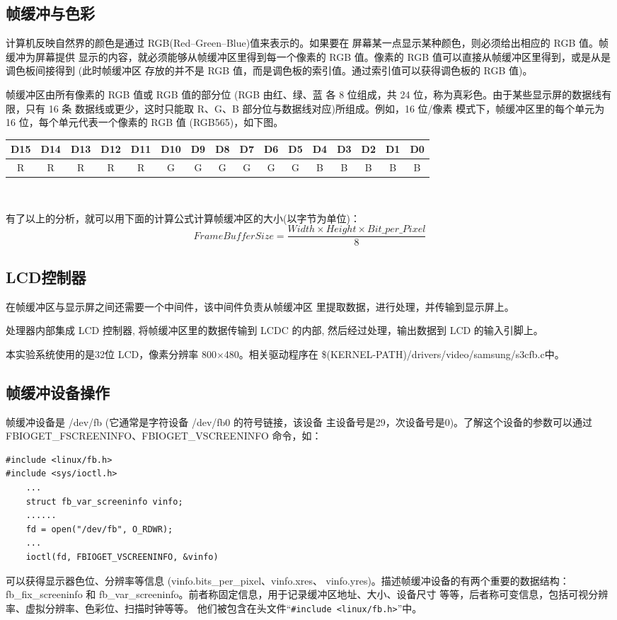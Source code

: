 \subsection{帧缓冲与色彩}
计算机反映自然界的颜色是通过 RGB(Red--Green--Blue)值来表示的。如果要在
屏幕某一点显示某种颜色，则必须给出相应的 RGB 值。帧缓冲为屏幕提供
显示的内容，就必须能够从帧缓冲区里得到每一个像素的 RGB 值。像素的
RGB 值可以直接从帧缓冲区里得到，或是从是调色板间接得到 (此时帧缓冲区
存放的并不是 RGB 值，而是调色板的索引值。通过索引值可以获得调色板的
RGB 值)。

帧缓冲区由所有像素的 RGB 值或 RGB 值的部分位 (RGB 由红、绿、蓝
各 8 位组成，共 24 位，称为真彩色。由于某些显示屏的数据线有限，只有 16 条
数据线或更少，这时只能取 R、G、B 部分位与数据线对应)所组成。例如，16 位/像素
模式下，帧缓冲区里的每个单元为 16 位，每个单元代表一个像素的 RGB 值
(RGB565)，如下图。\\

\small
\begin{tabular}{|*{16}{c|}}
\hline
   D15 & D14 & D13 & D12 & D11 & D10 & D9 & D8 &
        D7 & D6 & D5 & D4 & D3 & D2 & D1 & D0\\\hline
  R & R & R & R & R & G & G & G & G & G & G & B & B & B & B & B\\\hline
\end{tabular}
\ \\
\normalsize

有了以上的分析，就可以用下面的计算公式计算帧缓冲区的大小(以字节为单位)：
$$
	FrameBufferSize=\frac{Width \times Height \times Bit\_per\_Pixel}{8}
$$

\subsection{LCD控制器}
在帧缓冲区与显示屏之间还需要一个中间件，该中间件负责从帧缓冲区
里提取数据，进行处理，并传输到显示屏上。

处理器内部集成 LCD 控制器, 将帧缓冲区里的数据传输到 LCDC 的内部,
然后经过处理，输出数据到 LCD 的输入引脚上。

本实验系统使用的是32位 LCD，像素分辨率 800$\times$480。相关驱动程序在
\$(KERNEL-PATH)/drivers/video/samsung/s3cfb.c中。

\subsection{帧缓冲设备操作}
帧缓冲设备是 /dev/fb (它通常是字符设备 /dev/fb0 的符号链接，该设备
主设备号是29，次设备号是0)。了解这个设备的参数可以通过
FBIOGET\_FSCREENINFO、FBIOGET\_VSCREENINFO 命令，如：
\begin{lstlisting}
#include <linux/fb.h>
#include <sys/ioctl.h>
	...
	struct fb_var_screeninfo vinfo;
	......
	fd = open("/dev/fb", O_RDWR);
	...
    ioctl(fd, FBIOGET_VSCREENINFO, &vinfo)
\end{lstlisting}
可以获得显示器色位、分辨率等信息 (vinfo.bits\_per\_pixel、vinfo.xres、
vinfo.yres)。描述帧缓冲设备的有两个重要的数据结构：fb\_fix\_screeninfo 和
fb\_var\_screeninfo。前者称固定信息，用于记录缓冲区地址、大小、设备尺寸
等等，后者称可变信息，包括可视分辨率、虚拟分辨率、色彩位、扫描时钟等等。
他们被包含在头文件``\verb!#include <linux/fb.h>!''中。

